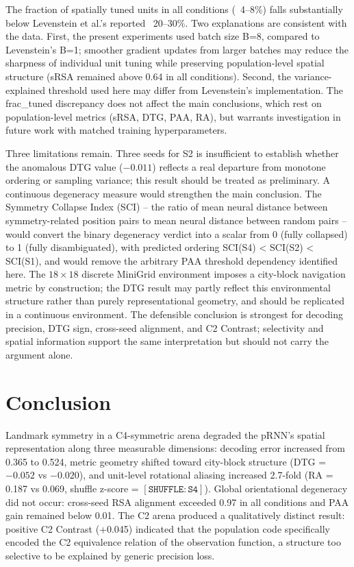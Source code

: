 ﻿\documentclass[10pt]{article}
\begin{document}
The fraction of spatially tuned units in all conditions (~4--8\%) falls substantially below Levenstein et al.'s reported ~20--30\%. Two explanations are consistent with the data. First, the present experiments used batch size B=8, compared to Levenstein's B=1; smoother gradient updates from larger batches may reduce the sharpness of individual unit tuning while preserving population-level spatial structure (sRSA remained above 0.64 in all conditions). Second, the variance-explained threshold used here may differ from Levenstein's implementation. The frac\_tuned discrepancy does not affect the main conclusions, which rest on population-level metrics (sRSA, DTG, PAA, RA), but warrants investigation in future work with matched training hyperparameters.

Three limitations remain. Three seeds for S2 is insufficient to establish whether the anomalous DTG value ($-0.011$) reflects a real departure from monotone ordering or sampling variance; this result should be treated as preliminary. A continuous degeneracy measure would strengthen the main conclusion. The Symmetry Collapse Index (SCI) -- the ratio of mean neural distance between symmetry-related position pairs to mean neural distance between random pairs -- would convert the binary degeneracy verdict into a scalar from 0 (fully collapsed) to 1 (fully disambiguated), with predicted ordering SCI(S4) < SCI(S2) < SCI(S1), and would remove the arbitrary PAA threshold dependency identified here. The $18\times18$ discrete MiniGrid environment imposes a city-block navigation metric by construction; the DTG result may partly reflect this environmental structure rather than purely representational geometry, and should be replicated in a continuous environment. The defensible conclusion is strongest for decoding precision, DTG sign, cross-seed alignment, and C2 Contrast; selectivity and spatial information support the same interpretation but should not carry the argument alone.

\section{Conclusion}

Landmark symmetry in a C4-symmetric arena degraded the pRNN's spatial representation along three measurable dimensions: decoding error increased from 0.365 to 0.524, metric geometry shifted toward city-block structure (DTG = $-0.052$ vs $-0.020$), and unit-level rotational aliasing increased 2.7-fold (RA = 0.187 vs 0.069, shuffle z-score = $\mathtt{[SHUFFLE:S4]}$). Global orientational degeneracy did not occur: cross-seed RSA alignment exceeded 0.97 in all conditions and PAA gain remained below 0.01. The C2 arena produced a qualitatively distinct result: positive C2 Contrast (+0.045) indicated that the population code specifically encoded the C2 equivalence relation of the observation function, a structure too selective to be explained by generic precision loss.
\end{document}
